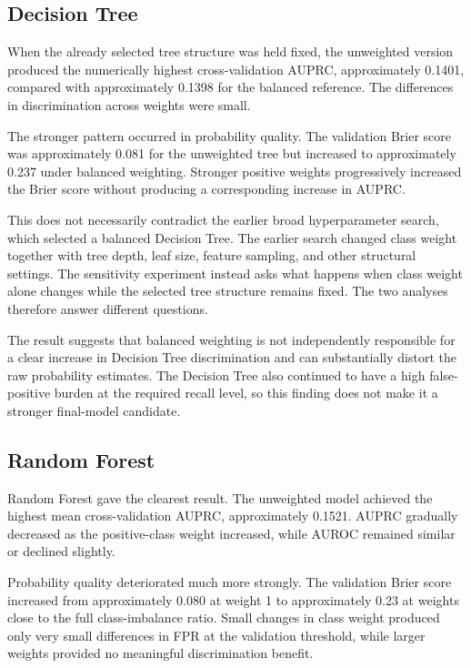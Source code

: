 \documentclass[11pt,a4paper]{article}
\begin{document}
\subsection{Decision Tree}

When the already selected tree structure was held fixed, the unweighted version produced the numerically highest cross-validation AUPRC, approximately 0.1401, compared with approximately 0.1398 for the balanced reference. The differences in discrimination across weights were small.

The stronger pattern occurred in probability quality. The validation Brier score was approximately 0.081 for the unweighted tree but increased to approximately 0.237 under balanced weighting. Stronger positive weights progressively increased the Brier score without producing a corresponding increase in AUPRC.

This does not necessarily contradict the earlier broad hyperparameter search, which selected a balanced Decision Tree. The earlier search changed class weight together with tree depth, leaf size, feature sampling, and other structural settings. The sensitivity experiment instead asks what happens when class weight alone changes while the selected tree structure remains fixed. The two analyses therefore answer different questions.

The result suggests that balanced weighting is not independently responsible for a clear increase in Decision Tree discrimination and can substantially distort the raw probability estimates. The Decision Tree also continued to have a high false-positive burden at the required recall level, so this finding does not make it a stronger final-model candidate.

\subsection{Random Forest}

Random Forest gave the clearest result. The unweighted model achieved the highest mean cross-validation AUPRC, approximately 0.1521. AUPRC gradually decreased as the positive-class weight increased, while AUROC remained similar or declined slightly.

Probability quality deteriorated much more strongly. The validation Brier score increased from approximately 0.080 at weight 1 to approximately 0.23 at weights close to the full class-imbalance ratio. Small changes in class weight produced only very small differences in FPR at the validation threshold, while larger weights provided no meaningful discrimination benefit.
\end{document}
